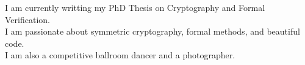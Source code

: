 \vspace{0.5cm}
\begin{center}
  \setlength\tabcolsep{0pt}
  \setlength{\extrarowheight}{0pt}
  \small
  \color{darkgray}
  I am currently writting my PhD Thesis on Cryptography and Formal Verification.\\
  I am passionate about symmetric cryptography, formal methods, and beautiful code.\\
  I am also a competitive ballroom dancer and a photographer.
\end{center}
